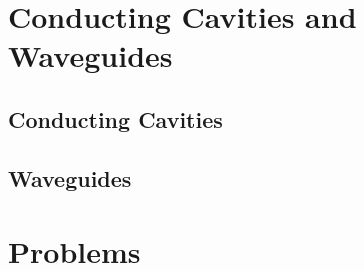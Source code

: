 \section{Conducting Cavities and Waveguides}\label{sec:5.6}

\subsection{Conducting Cavities}

\subsection{Waveguides}


\section*{Problems}



